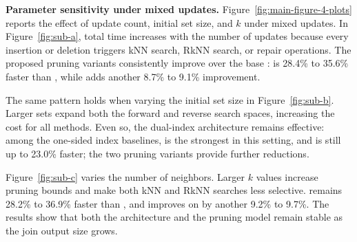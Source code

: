\noindent\textbf{Parameter sensitivity under mixed updates.}
Figure~\ref{fig:main-figure-4-plots} reports the effect of update count, initial set size, and $k$ under mixed updates. In Figure~\ref{fig:sub-a}, total time increases with the number of updates because every insertion or deletion triggers kNN search, RkNN search, or repair operations. The proposed pruning variants consistently improve over the base \dualtree: \dualtreefast is 28.4\% to 35.6\% faster than \dualtree, while \dualtreeopt adds another 8.7\% to 9.1\% improvement.

The same pattern holds when varying the initial set size in Figure~\ref{fig:sub-b}. Larger sets expand both the forward and reverse search spaces, increasing the cost for all methods. Even so, the dual-index architecture remains effective: among the one-sided index baselines, \deltatree is the strongest in this setting, and \dualtree is still up to 23.0\% faster; the two pruning variants provide further reductions.

Figure~\ref{fig:sub-c} varies the number of neighbors. Larger $k$ values increase pruning bounds and make both kNN and RkNN searches less selective. \dualtreefast remains 28.2\% to 36.9\% faster than \dualtree, and \dualtreeopt improves on \dualtreefast by another 9.2\% to 9.7\%. The results show that both the architecture and the pruning model remain stable as the join output size grows.

